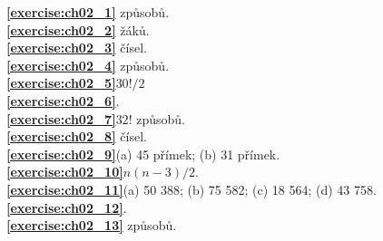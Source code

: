 
\textbf{\ref{exercise:ch02_1}} způsobů.\\
\textbf{\ref{exercise:ch02_2}} žáků.\\
\textbf{\ref{exercise:ch02_3}} čísel.\\
\textbf{\ref{exercise:ch02_4}} způsobů.\\
\textbf{\ref{exercise:ch02_5}}\quad $30!/2$\\
\textbf{\ref{exercise:ch02_6}}.\\
\textbf{\ref{exercise:ch02_7}}\quad $32!$ způsobů.\\
\textbf{\ref{exercise:ch02_8}} čísel.\\
\textbf{\ref{exercise:ch02_9}}\quad (a) 45 přímek; (b) 31 přímek.\\
\textbf{\ref{exercise:ch02_10}}\quad $n(n-3)/2$.\\
\textbf{\ref{exercise:ch02_11}}\quad (a) 50 388; (b) 75 582; (c) 18 564; (d) 43 758.\\
\textbf{\ref{exercise:ch02_12}}.\\
\textbf{\ref{exercise:ch02_13}} způsobů.\\